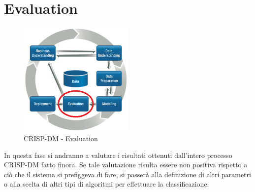 \chapter{Evaluation}

\begin{figure}[hbtp]
	\centering
	\includegraphics[width=0.5\textwidth]{./images/CRISPDM_5.png}
	\caption{CRISP-DM - Evaluation}
	\label{CRISPDM_5}
\end{figure}
In questa fase si andranno a valutare i risultati ottenuti dall'intero processo CRISP-DM fatto finora. Se tale valutazione risulta essere non positiva rispetto a ciò che il sistema si prefiggeva di fare, si passerà alla definizione di altri parametri o alla scelta di altri tipi di algoritmi per effettuare la classificazione.

